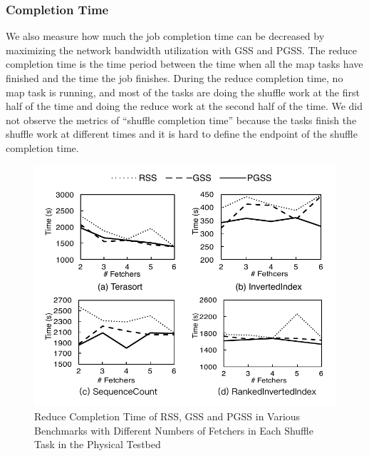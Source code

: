 \documentclass[10pt,journal,compsoc]{IEEEtran}
\begin{document}
\subsubsection{Completion Time}
We also measure how much the job completion time can be decreased by maximizing the network bandwidth utilization with GSS and PGSS. 
The reduce completion time is the time period between the time when all the
map tasks have finished and the time the job finishes.
During the reduce completion time, no map task is running, and most of
the tasks are doing the shuffle work at the first half of the time and
doing the reduce work at the second half of the time.
We did not observe the metrics of ``shuffle completion time'' because
the tasks finish the shuffle work at different times and it is hard to
define the endpoint of the shuffle completion time.


\begin{figure}
\centering
\includegraphics[width=1\columnwidth]{figure7}
\caption{Reduce Completion Time of RSS, GSS and PGSS in Various Benchmarks with Different Numbers of Fetchers in Each Shuffle Task
in the Physical Testbed} 
\label{fig:new_reduce_completion}
\end{figure}
\end{document}

